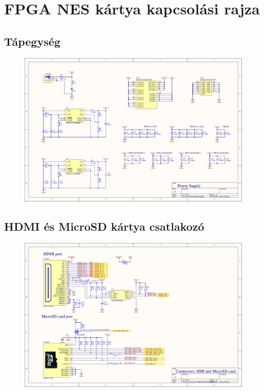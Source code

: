 \newpage
\section{FPGA NES kártya kapcsolási rajza}
\subsection{Tápegység}
\label{sec:PSU}
\begin{figure}[H]
	\centering
	\includegraphics[width=220mm, keepaspectratio, angle=90]{figures/PSU}
\end{figure}
\subsection{HDMI és MicroSD kártya csatlakozó}
\label{sec:HDMI-MicroSDcard}
\begin{figure}[H]
	\centering
	\includegraphics[width=220mm, keepaspectratio, angle=90]{figures/HDMI-MicroSDcard}
\end{figure}

